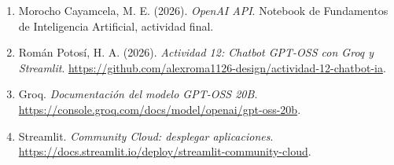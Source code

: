\documentclass[11pt,a4paper]{article}
\begin{document}
\begin{enumerate}

\item Morocho Cayamcela, M. E. (2026).
\emph{OpenAI API}.
Notebook de Fundamentos de Inteligencia Artificial,
actividad final.

\item Román Potosí, H. A. (2026).
\emph{Actividad 12: Chatbot GPT-OSS con Groq y Streamlit}.
\url{https://github.com/alexroma1126-design/actividad-12-chatbot-ia}.

\item Groq.
\emph{Documentación del modelo GPT-OSS 20B}.
\url{https://console.groq.com/docs/model/openai/gpt-oss-20b}.

\item Streamlit.
\emph{Community Cloud: desplegar aplicaciones}.
\url{https://docs.streamlit.io/deploy/streamlit-community-cloud}.

\end{enumerate}
\end{document}
